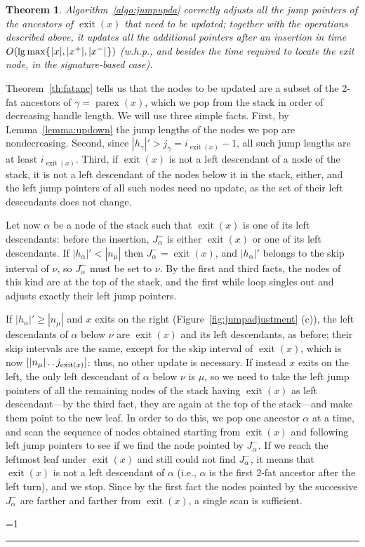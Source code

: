 \documentclass[a4paper]{article}
\newcounter{noqed}
\newcommand{\qed}{ \ifmmode\mbox{
}\fi\rule[-.05em]{.3em}{.7em}\setcounter{noqed}{0}}
\newenvironment{proof}[1][{}]{\noindent{\bf Proof#1.
}\setcounter{noqed}{1}}{\ifnum\value{noqed}=1\qed\fi\par\medskip}
\newtheorem{theorem}{Theorem}
\newcommand{\exit}[1]{\operatorname{exit}(#1)}
\newcommand{\parex}[1]{\operatorname{parex}(#1)}
\newcommand{\?}{\mskip1.5mu}
\def\..{\,\mathpunct{\ldotp\ldotp}} %
\begin{document}
\begin{theorem}
\label{th:correctjumpupd}
Algorithm~\ref{algo:jumpupda} correctly adjusts all the jump pointers of the ancestors of $\exit x$ that need to be updated;
together with the operations described above, it updates all the additional pointers after an insertion
in time $O(\lg \max\{\?|x|, |x^+|, |x^-|\?\})$ (w.h.p., and besides the time required to locate the exit node, in the signature-based case).
\end{theorem}
\begin{proof}
Theorem~\ref{th:fatanc} tells us that the nodes to be updated are a subset of the 2-fat ancestors of $\gamma=\parex x$,
which we pop from the stack in order of decreasing handle length. We will use three simple facts. 
First, by Lemma~\ref{lemma:updown} the jump lengths of the nodes we pop are nondecreasing. 
Second, since $|h_\gamma|'>j_\gamma=i_{\exit x}-1$, all such jump lengths are at least $i_{\exit x}$. Third,
if $\exit x$ is not a left descendant of a node of the stack, it is not a left descendant of the nodes below it in the stack, 
either, and the left jump pointers of all such nodes need no update, as the set of their left descendants does not change. 

Let now $\alpha$ be a node of the stack such that $\exit x$ is one of its left descendants: 
before the insertion, $J^-_\alpha$ is either $\exit x$ or one of its left descendants. If $|h_\alpha|'<|n_\mu|$ then $J^-_\alpha=\exit x$, and 
$|h_\alpha|'$ belongs to the skip interval of $\nu$, so $J^-_\alpha$ must be set to $\nu$. By the first and third facts, 
the nodes of this kind are at the top of the stack, and the first while loop singles out and adjusts exactly their left jump pointers.

If $|h_\alpha|'\geq|n_\mu|$ and $x$ exits on the right (Figure~\ref{fig:jumpadjustment} (c)), the left descendants of $\alpha$ 
below $\nu$ are $\exit x$ and its left descendants, as before; their skip intervals are the same, except for the skip interval of $\exit x$, 
which is now $[|n_\mu|\..j_{\exit x}]$: thus, no other update is necessary.
If instead $x$ exits on the left, the only left descendant of $\alpha$ below $\nu$ is $\mu$, so we 
need to take the left jump pointers of all the remaining nodes of the stack having $\exit x$ as left descendant---by the third fact, they are again
at the top of the stack---and make them point to the new leaf. 
In order to do this, we pop one ancestor $\alpha$ at a time, and scan the sequence of nodes obtained starting from $\exit x$
and following left jump pointers to see if we find the node pointed by $J^-_\alpha$. If we reach the leftmost
leaf under $\exit x$ and still could not find  $J^-_\alpha$, it means that $\exit x$ is not a left descendant of $\alpha$
(i.e., $\alpha$ is the first 2-fat ancestor after
the left turn), and we stop. Since by the first fact the nodes pointed by the successive $J^-_\alpha$ are farther and farther from $\exit x$, 
a single scan is sufficient.


\end{proof}
\end{document}
